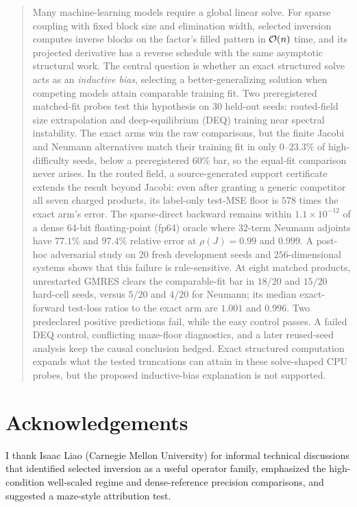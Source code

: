 \documentclass[11pt]{article}
\theoremstyle{plain}
\theoremstyle{remark}
\begin{document}
\begin{titlepage}
\begin{quote}\small
Many machine-learning models require a global linear solve. For sparse
coupling with fixed block size and elimination width, selected inversion computes inverse blocks on the
factor's filled pattern in $\mathcal{O}(n)$ time, and its projected derivative has
a reverse schedule with the same asymptotic structural work. The central
question is whether an
exact structured solve acts as an \emph{inductive bias}, selecting a
better-generalizing solution when competing models attain comparable
training fit. Two preregistered matched-fit probes test this hypothesis on
$30$ held-out seeds: routed-field size extrapolation and deep-equilibrium
(DEQ) training near spectral instability. The exact arms win the raw
comparisons, but the finite Jacobi and Neumann alternatives match their
training fit in only $0$--$23.3\%$ of high-difficulty seeds, below a
preregistered $60\%$ bar, so the equal-fit comparison never arises. In the
routed field, a source-generated support certificate extends the result beyond
Jacobi: even after granting a generic competitor all seven charged products,
its label-only test-MSE floor is $578$ times the exact arm's error. The
sparse-direct backward remains within
$1.1\times10^{-12}$ of a dense 64-bit floating-point (fp64) oracle where
32-term Neumann adjoints have
$77.1\%$ and $97.4\%$ relative error at $\rho(J)=0.99$ and $0.999$.
A post-hoc adversarial study on 20 fresh development seeds and
$256$-dimensional systems shows that this failure is rule-sensitive. At eight
matched products, unrestarted GMRES clears the comparable-fit bar in $18/20$
and $15/20$ hard-cell seeds, versus $5/20$ and $4/20$ for Neumann; its median
exact-forward test-loss ratios to the exact arm are $1.001$ and $0.996$. Two
predeclared positive predictions fail, while the easy control passes. A failed
DEQ control, conflicting maze-floor diagnostics, and a later reused-seed
analysis keep the causal conclusion hedged. Exact structured computation
expands what the tested truncations can attain in these solve-shaped CPU
probes, but the proposed inductive-bias explanation is not supported.
\end{quote}

\end{titlepage}
\setcounter{page}{2}











\section*{Acknowledgements}
I thank Isaac Liao (Carnegie Mellon University) for informal technical
discussions that identified selected inversion as a useful operator family,
emphasized the high-condition well-scaled regime and dense-reference precision
comparisons, and suggested a maze-style attribution test.

\appendix


\small


\end{document}
